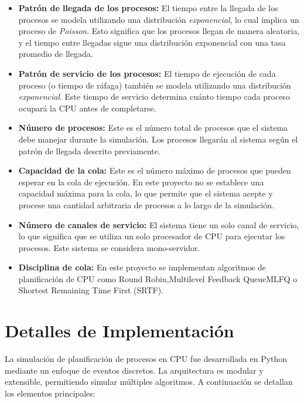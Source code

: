 \documentclass[12pt]{article}
\begin{document}
\begin{itemize}
	\item \textbf{Patrón de llegada de los procesos:} El tiempo entre la llegada de los procesos se modela utilizando una distribución \textit{exponencial}, lo cual implica un proceso de \textit{Poisson}. Esto significa que los procesos llegan de manera aleatoria, y el tiempo entre llegadas sigue una distribución exponencial con una tasa promedio de llegada.
	
	\item \textbf{Patrón de servicio de los procesos:} El tiempo de ejecución de cada proceso (o tiempo de ráfaga) también se modela utilizando una distribución \textit{exponencial}. Este tiempo de servicio determina cuánto tiempo cada proceso ocupará la CPU antes de completarse.
	
	\item \textbf{Número de procesos:} Este es el número total de procesos que el sistema debe manejar durante la simulación. Los procesos llegarán al sistema según el patrón de llegada descrito previamente.
	
	\item \textbf{Capacidad de la cola:} Este es el número máximo de procesos que pueden esperar en la cola de ejecución. En este proyecto no se establece una capacidad máxima para la cola, lo que permite que el sistema acepte y procese una cantidad arbitraria de procesos a lo largo de la simulación.
	
	\item \textbf{Número de canales de servicio:} El sistema tiene un solo canal de servicio, lo que significa que se utiliza un solo procesador de CPU para ejecutar los procesos. Este sistema se considera mono-servidor.
	
	\item \textbf{Disciplina de cola:} En este proyecto se implementan algoritmos de planificación de CPU como Round Robin,Multilevel Feedback Queue{MLFQ} o Shortest Remaining Time First (SRTF).
	
\end{itemize}


\section{Detalles de Implementación}

La simulación de planificación de procesos en CPU fue desarrollada en Python mediante un enfoque de eventos discretos. La arquitectura es modular y extensible, permitiendo simular múltiples algoritmos. A continuación se detallan los elementos principales:
\end{document}
